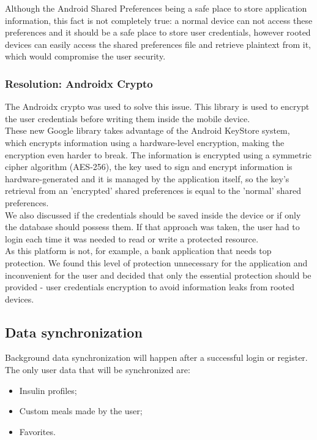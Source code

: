 Although the Android Shared Preferences being a safe place to store application information, this fact is not completely true:
a normal device can not access these preferences and it should be a safe place to store user credentials, however rooted devices\cite{root} can easily
access the shared preferences file and retrieve plaintext from it, which would compromise the user security.\\

\subsubsection{Resolution: Androidx Crypto}

The Androidx crypto\cite{crypto} was used to solve this issue. This library is used to encrypt the user credentials before writing them inside the mobile device.\\

These new Google library takes advantage of the Android KeyStore\cite{keystore} system, which encrypts information using a hardware-level encryption, making the
encryption even harder to break. The information is encrypted using a symmetric cipher algorithm (AES-256), the key used to sign and encrypt information
is hardware-generated and it is managed by the application itself, so the key's retrieval from an 'encrypted' shared preferences is equal to the 'normal'
shared preferences.\\

We also discussed if the credentials should be saved inside the device or if only the database should possess them.
If that approach was taken, the user had to login each time it was needed to read or write a protected resource.\\

As this platform is not, for example, a bank application that needs top protection. We found this level of protection
unnecessary for the application and inconvenient for the user and decided that only the essential protection should be provided - 
user credentials encryption to avoid information leaks from rooted devices.

\subsection{Data synchronization}

Background data synchronization will happen after a successful login or register. The only user data that will be synchronized are:
\begin{itemize}
    \item Insulin profiles;
    \item Custom meals made by the user;
    \item Favorites.
\end{itemize}

